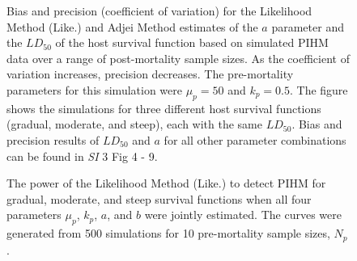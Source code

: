 \documentclass[12pt, a4paper]{article}
\begin{document}
\begin{figure}


    \captionsetup{justification=raggedright, singlelinecheck=false}

    \caption{Bias and precision (coefficient of variation) for the Likelihood Method (Like.) and Adjei Method estimates of the $a$ parameter and the $LD_{50}$ of the host survival function based on simulated PIHM data over a range of post-mortality sample sizes.  As the coefficient of variation increases, precision decreases. The pre-mortality parameters for this simulation were $\mu_p = 50$ and $k_p = 0.5$.  The figure shows the simulations for three different host survival functions (gradual, moderate, and steep), each with the same $LD_{50}$.  Bias and precision results of $LD_{50}$ and $a$ for all other parameter combinations can be found in \emph{SI} 3 Fig 4 - 9.}

    \label{fig:question2}

\end{figure}

\begin{figure}

    \captionsetup{justification=raggedright, singlelinecheck=false}

    \caption{The power of the Likelihood Method (Like.) to detect PIHM for gradual, moderate, and steep survival functions when all four parameters $\mu_p$, $k_p$, $a$, and $b$ were jointly estimated. The curves were generated from 500 simulations for 10 pre-mortality sample sizes, $N_p$.}

    \label{fig:real_power}

\end{figure}
\end{document}
